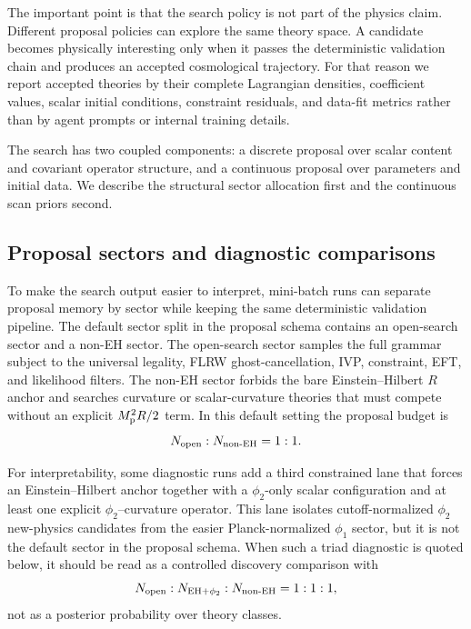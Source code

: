 \documentclass[aps,prd,twocolumn,superscriptaddress,nofootinbib,longbibliography]{revtex4-2}
\newcommand{\Mp}{M_{\rm p}}
\begin{document}
The important point is that the search policy is not part of the physics claim.  Different proposal policies can explore the same theory space.  A candidate becomes physically interesting only when it passes the deterministic validation chain and produces an accepted cosmological trajectory.  For that reason we report accepted theories by their complete Lagrangian densities, coefficient values, scalar initial conditions, constraint residuals, and data-fit metrics rather than by agent prompts or internal training details.

The search has two coupled components: a discrete proposal over scalar content and covariant operator structure, and a continuous proposal over parameters and initial data.  We describe the structural sector allocation first and the continuous scan priors second.

\subsection{Proposal sectors and diagnostic comparisons}
\label{subsec:sector-separated-search}

To make the search output easier to interpret, mini-batch runs can separate proposal memory by sector while keeping the same deterministic validation pipeline.  The default sector split in the proposal schema contains an open-search sector and a non-EH sector.  The open-search sector samples the full grammar subject to the universal legality, FLRW ghost-cancellation, IVP, constraint, EFT, and likelihood filters.  The non-EH sector forbids the bare Einstein--Hilbert $R$ anchor and searches curvature or scalar-curvature theories that must compete without an explicit $\Mp^2R/2$ term.  In this default setting the proposal budget is
\begin{equation}
N_{\rm open}:N_{\rm non\text{-}EH}=1:1 .
\label{eq:default-sector-budget}
\end{equation}

For interpretability, some diagnostic runs add a third constrained lane that forces an Einstein--Hilbert anchor together with a $\phi_2$-only scalar configuration and at least one explicit $\phi_2$--curvature operator.  This lane isolates cutoff-normalized $\phi_2$ new-physics candidates from the easier Planck-normalized $\phi_1$ sector, but it is not the default sector in the proposal schema.  When such a triad diagnostic is quoted below, it should be read as a controlled discovery comparison with
\begin{equation}
N_{\rm open}:N_{\rm EH+\phi_2}:N_{\rm non\text{-}EH}=1:1:1,
\label{eq:triad-budget}
\end{equation}
not as a posterior probability over theory classes.
\end{document}
